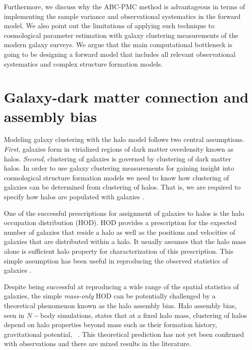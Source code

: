Furthermore, we discuss why the ABC-PMC method is advantageous in terms of implementing the sample variance and observational systematics in the forward model.
We also point out the limitations of applying such technique to cosmological parameter estimation with galaxy clustering measurements of the modern galaxy surveys. 
We argue that the main computational bottleneck is going to be designing a forward model that includes all relevant observational systematics and complex structure formation models. 


\section{Galaxy-dark matter connection and assembly bias}

Modeling galaxy clustering with the halo model follows two central assumptions. \emph{First}, galaxies form in virialized regions of 
dark matter overdensity known as halos. \emph{Second}, clustering of galaxies is governed by clustering of dark matter halos. 
In order to use galaxy clustering measurements for gaining insight into cosmological structure formation models we need to 
know how clustering of galaxies can be determined from clustering of halos. That is, we are required to specify how halos 
are populated with galaxies \citep{seljak2000,scoccimarro2001,berlind_weinberg2002}.

One of the successful prescriptions for assignment of galaxies to halos is the halo occupation distribution (HOD). 
HOD provides a prescription for the expected number of galaxies that reside a halo as well as 
the positions and velocities of galaxies that are distributed within a halo. It usually assumes that the halo mass alone 
is sufficient halo property for characterization of this prescription. This simple assumption has been useful 
in reproducing the observed statistics of galaxies \citep{tinker_rsd2007,zehavi2011,zheng_guo}.

Despite being successful at reproducing a wide range of the spatial statistics of galaxies, the simple \emph{mass-only} HOD can be potentially 
challenged by a theoretical phenomenon known as the halo assembly bias. Halo assembly bias, seen in $N-$body simulations, states that at a fixed halo mass, clustering 
of halos depend on halo properties beyond mass such as their formation history, gravitational potential, \etc\ \citep{weschler2006,gao2007,arz2014,sunayama2016}.
This theoretical prediction has not yet been confirmed with observations and there are mixed results in the literature.

